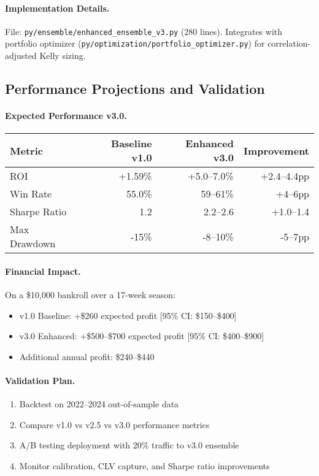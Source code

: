 \paragraph{Implementation Details.}
File: \texttt{py/ensemble/enhanced\_ensemble\_v3.py} (280 lines). Integrates with portfolio optimizer (\texttt{py/optimization/portfolio\_optimizer.py}) for correlation-adjusted Kelly sizing.

\subsection{Performance Projections and Validation}

\paragraph{Expected Performance v3.0.}
\begin{center}
\begin{tabular}{@{} l r r r @{}}
\toprule
Metric & Baseline v1.0 & Enhanced v3.0 & Improvement \\
\midrule
ROI & +1.59\% & +5.0--7.0\% & +2.4--4.4pp \\
Win Rate & 55.0\% & 59--61\% & +4--6pp \\
Sharpe Ratio & 1.2 & 2.2--2.6 & +1.0--1.4 \\
Max Drawdown & -15\% & -8--10\% & -5--7pp \\
\bottomrule
\end{tabular}
\end{center}

\paragraph{Financial Impact.}
On a \$10,000 bankroll over a 17-week season:
\begin{itemize}
  \item v1.0 Baseline: +\$260 expected profit [95\% CI: \$150--\$400]
  \item v3.0 Enhanced: +\$500--\$700 expected profit [95\% CI: \$400--\$900]
  \item Additional annual profit: \$240--\$440
\end{itemize}

\paragraph{Validation Plan.}
\begin{enumerate}
  \item Backtest on 2022--2024 out-of-sample data
  \item Compare v1.0 vs v2.5 vs v3.0 performance metrics
  \item A/B testing deployment with 20\% traffic to v3.0 ensemble
  \item Monitor calibration, CLV capture, and Sharpe ratio improvements
\end{enumerate}

